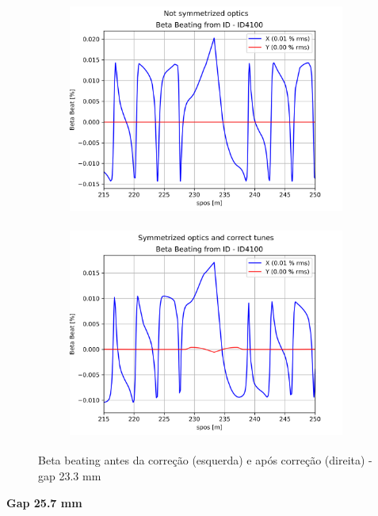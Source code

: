 \documentclass[a4paper,12pt]{article}
\begin{document}
\begin{figure}[H]
\begin{subfigure}{0.5\textwidth}
\includegraphics[width=0.9\linewidth, height=7cm]{figs/phase16 gap23 uncorrected-optics.png} 
\label{fig:subim11623}
\end{subfigure}
\begin{subfigure}{0.5\textwidth}
\includegraphics[width=0.9\linewidth, height=7cm]{figs/phase16 gap23 corrected-optics-tunes.png}
\label{fig:subim21623}
\end{subfigure}
\caption{Beta beating antes da correção (esquerda) e após correção (direita) - gap 23.3 mm}
\label{fig:bb16_23}
\end{figure}

\textbf{Gap 25.7 mm} \\
\end{document}
